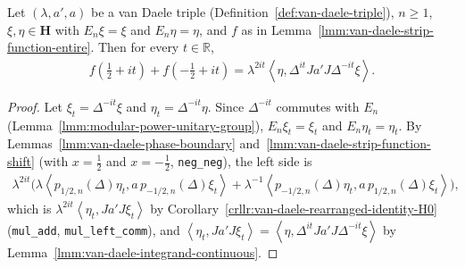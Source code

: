 \begin{lemma}
    \label{lmm:van-daele-strip-function-boundary}
    \leanok
    Let $(\lambda, a', a)$ be a van Daele triple (Definition~\ref{def:van-daele-triple}), $n \ge 1$, $\xi, \eta \in \mathbf{H}$ with $E_n\xi = \xi$ and $E_n\eta = \eta$, and $f$ as in Lemma~\ref{lmm:van-daele-strip-function-entire}. Then for every $t \in \mathbb{R}$,
    \begin{align}
        f(\tfrac{1}{2} + it) + f(-\tfrac{1}{2} + it) = \lambda^{2it}\left< \eta, \Delta^{it}Ja'J\Delta^{-it}\xi \right>.
    \end{align}
\end{lemma}
\begin{proof}
    \leanok
    Let $\xi_t = \Delta^{-it}\xi$ and $\eta_t = \Delta^{-it}\eta$. Since $\Delta^{-it}$ commutes with $E_n$ (Lemma~\ref{lmm:modular-power-unitary-group}), $E_n\xi_t = \xi_t$ and $E_n\eta_t = \eta_t$. By Lemmas~\ref{lmm:van-daele-phase-boundary} and~\ref{lmm:van-daele-strip-function-shift} (with $x = \tfrac{1}{2}$ and $x = -\tfrac{1}{2}$, \texttt{neg\_neg}), the left side is
    \begin{align}
        \lambda^{2it}\Big( \lambda\left< p_{1/2,n}(\Delta)\eta_t, a\,p_{-1/2,n}(\Delta)\xi_t \right> + \lambda^{-1}\left< p_{-1/2,n}(\Delta)\eta_t, a\,p_{1/2,n}(\Delta)\xi_t \right> \Big),
    \end{align}
    which is $\lambda^{2it}\left< \eta_t, Ja'J\xi_t \right>$ by Corollary~\ref{crllr:van-daele-rearranged-identity-H0} (\texttt{mul\_add}, \texttt{mul\_left\_comm}), and $\left< \eta_t, Ja'J\xi_t \right> = \left< \eta, \Delta^{it}Ja'J\Delta^{-it}\xi \right>$ by Lemma~\ref{lmm:van-daele-integrand-continuous}.
\end{proof}

